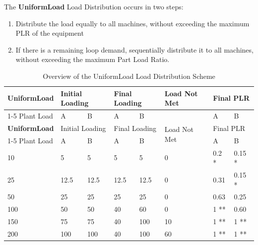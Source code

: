 The \textbf{UniformLoad} Load Distribution occurs in two steps:

\begin{enumerate}
    \def\labelenumi{Step \arabic{enumi}:}
\item
    Distribute the load equally to all machines, without exceeding the maximum PLR of the equipment
\item
    If there is a remaining loop demand, sequentially distribute it to all machines, without exceeding the maximum Part Load Ratio.
\end{enumerate}


\begin{longtable}[c]{|l|p{0.5in}|p{0.5in}|p{0.5in}|p{0.5in}|l|p{0.5in}|p{0.5in}|}
    \caption{Overview of the UniformLoad Load Distribution Scheme}
    \label{tab:uniform-load-overview}\\
\hline
\textbf{UniformLoad} & \multicolumn{2}{l|}{Initial Loading} & \multicolumn{2}{l|}{Final Loading} & \multirow{2}{*}{Load Not Met} & \multicolumn{2}{l|}{Final PLR} \\ \cline{1-5} \cline{7-8}
Plant Load           & A                 & B                & A                & B               &                               & A              & B             \\ \hline
\endfirsthead
\hline
\textbf{UniformLoad} & \multicolumn{2}{l|}{Initial Loading} & \multicolumn{2}{l|}{Final Loading} & \multirow{2}{*}{Load Not Met} & \multicolumn{2}{l|}{Final PLR} \\ \cline{1-5} \cline{7-8}
Plant Load           & A                 & B                & A                & B               &                               & A              & B             \\ \hline
\endhead

10          & 5                 & 5                & 5            & 5           & 0                      & 0.2 *      & 0.15 *      \\ \hline
25          & 12.5              & 12.5             & 12.5         & 12.5        & 0                      & 0.31       & 0.15 *      \\ \hline
50          & 25                & 25               & 25           & 25          & 0                      & 0.63       & 0.25        \\ \hline
100         & 50                & 50               & 40           & 60          & 0                      & 1 **       & 0.60        \\ \hline
150         & 75                & 75               & 40           & 100         & 10                     & 1 **       & 1 **        \\ \hline
200         & 100               & 100              & 40           & 100         & 60                     & 1 **       & 1 **        \\ \hline

\end{longtable}



